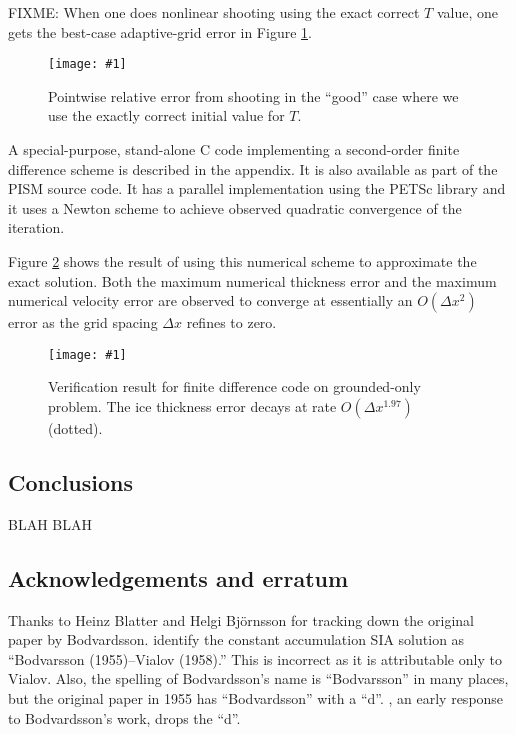 \documentclass[twocolumn,letterpaper]{igs}
\newcommand{\onecol}[1]{\texttt{[image: \#1]}}
\begin{document}
FIXME:  When one does nonlinear shooting using the exact correct $T$ value, one gets the best-case adaptive-grid error in Figure \ref{fig:shoot-good-error}.

\begin{figure}[ht]
\onecol{exactmarine-good-error}
\caption{Pointwise relative error from shooting in the ``good'' case where we use the exactly correct initial value for $T$.} \label{fig:shoot-good-error}
\end{figure}

A special-purpose, stand-alone C code implementing a second-order finite difference scheme is described in the appendix.  It is also available as part of the PISM source code.  It has a parallel implementation using the PETSc \citep{petsc-user-ref} library and it uses a Newton scheme to achieve observed quadratic convergence of the iteration.

Figure \ref{fig:verifNresult} shows the result of using this numerical scheme to approximate the exact solution.  Both the maximum numerical thickness error and the maximum numerical velocity error are observed to converge at essentially an $O(\Delta x^2)$ error as the grid spacing $\Delta x$ refines to zero.  

\begin{figure}[ht]
\onecol{verifN}
\caption{Verification result for finite difference code on grounded-only problem.  The ice thickness error decays at rate $O(\Delta x^{1.97})$ (dotted).} \label{fig:verifNresult}
\end{figure}


\subsection*{Conclusions} BLAH BLAH

\subsection*{Acknowledgements and erratum}  Thanks to Heinz Blatter and Helgi Bj\"ornsson for tracking down the original paper by Bodvardsson.  \cite{BLKCB} identify the constant accumulation SIA solution as ``Bodvarsson (1955)--Vialov (1958).''  This is incorrect as it is attributable only to Vialov.  Also, the spelling of Bodvardsson's name is ``Bodvarsson'' in many places, but the original paper in 1955 has ``Bodvardsson'' with a ``d''.  \cite{Weertman61stability}, an early response to Bodvardsson's work, drops the ``d''.




\end{document}
